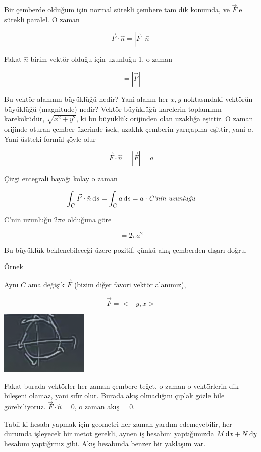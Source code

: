 \documentclass[12pt,fleqn]{article}\usepackage{../../common}
\begin{document}
Bir çemberde olduğum için normal sürekli çembere tam dik konumda, ve
$\vec{F}$'e sürekli paralel. O zaman 

$$ \vec{F} \cdot \hat{n} = |\vec{F}||\hat{n}| $$

Fakat $\hat{n}$ birim vektör olduğu için uzunluğu 1, o zaman

$$  = |\vec{F}| $$

Bu vektör alanının büyüklüğü nedir? Yani alanın her $x,y$ noktasındaki
vektörün büyüklüğü (magnitude) nedir? Vektör büyüklüğü karelerin toplamının
kareköküdür, $\sqrt{x^2 + y^2}$, ki bu büyüklük orijinden olan uzaklığa
eşittir. O zaman orijinde oturan çember üzerinde isek, uzaklık çemberin
yarıçapına eşittir, yani $a$. Yani üstteki formül şöyle olur

$$ \vec{F} \cdot \hat{n} = |\vec{F}| = a$$

Çizgi entegrali bayağı kolay o zaman

$$ \int_C \vec{F} \cdot \hat{n} \,\mathrm{d} s 
= \int_C a \,\mathrm{d} s  = a \cdot \textit{C'nin uzunluğu}
$$

C'nin uzunluğu $2\pi a$ olduğuna göre

$$ = 2\pi a^2 $$

Bu büyüklük beklenebileceği üzere pozitif, çünkü akış çemberden dışarı
doğru. 

Örnek

Aynı $C$ ama değişik $\vec{F}$ (bizim diğer favori vektör alanımız), 

$$ \vec{F} = < -y,x > $$

\begin{center}
\includegraphics[height=3cm]{23_7.png}
\end{center}

Fakat burada vektörler her zaman çembere teğet, o zaman o vektörlerin dik
bileşeni olamaz, yani sıfır olur. Burada akış olmadığını çıplak gözle bile
görebiliyoruz. $\vec{F} \cdot \hat{n} = 0$, o zaman akış = 0. 

Tabii ki hesabı yapmak için geometri her zaman yardım edemeyebilir, her durumda
işleyecek bir metot gerekli, aynen iş hesabını yaptığımızda $M \,\mathrm{d} x + N \,\mathrm{d} y$
hesabını yaptığımız gibi. Akış hesabında benzer bir yaklaşım var.
\end{document}
